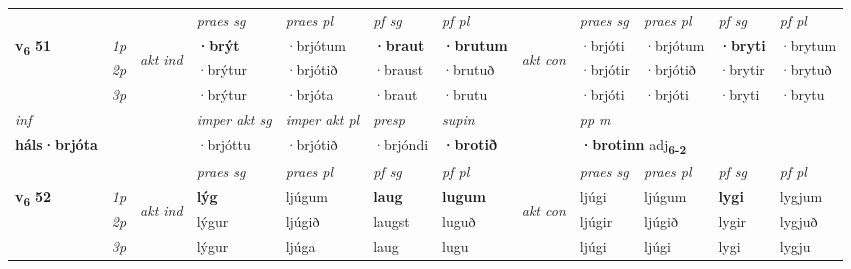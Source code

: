\begin{longtable}[l]{X>{\footnotesize\itshape}llXXXXlXXXX}
 & &   & \textit{praes sg}  & \textit{praes pl}    & \textit{ pf sg} & \textit{pf pl} & & \textit{praes sg}  & \textit{praes pl}    & \textit{pf sg} & \textit{pf pl }  \\ \cmidrule{4-7} \cmidrule{9-12}
 \multirow{2}{*}{{{\textbf{v{\textsubscript{6}}} \Large{\textbf{51}}}}}  & 1p & \multirow{3}{*}{\begin{turn}{90}\textit{akt ind}\end{turn}} & \textbf{·brýt} & ·brjótum & \textbf{·braut} & \textbf{·brutum} & \multirow{3}{*}{\begin{turn}{90}\textit{akt con}\end{turn}} &·brjóti & ·brjótum & \textbf{·bryti} & ·brytum\\*
 & 2p &  &  ·brýtur  & ·brjótið & ·braust & ·brutuð & & ·brjótir & ·brjótið & ·brytir & ·brytuð \\*
 & 3p &  & ·brýtur & ·brjóta & ·braut & ·brutu & & ·brjóti & ·brjóti& ·bryti & ·brytu \\*
\cmidrule{4-7} \cmidrule{9-12}

   {\textit{inf}} & &  & \textit{imper akt sg} & \textit{imper akt pl}   & \textit{presp} & \textit{supin}  && \textit{pp m} \\*
  {\textbf{háls\allowbreak ·brjóta}} & && ·brjóttu  & ·brjótið   & ·brjóndi &  \textbf{·brotið}  && \multicolumn{2}{l}{\textbf{·brotinn} adj\textbf{\textsubscript{6-2}}} \\*

\midrule

 & &   & \textit{praes sg}  & \textit{praes pl}    & \textit{ pf sg} & \textit{pf pl} & & \textit{praes sg}  & \textit{praes pl}    & \textit{pf sg} & \textit{pf pl }  \\ \cmidrule{4-7} \cmidrule{9-12}
 \multirow{2}{*}{{{\textbf{v{\textsubscript{6}}} \Large{\textbf{52}}}}}  & 1p & \multirow{3}{*}{\begin{turn}{90}\textit{akt ind}\end{turn}} & \textbf{lýg} & ljúgum & \textbf{laug} & \textbf{lugum} & \multirow{3}{*}{\begin{turn}{90}\textit{akt con}\end{turn}} &ljúgi & ljúgum & \textbf{lygi} & lygjum\\*
 & 2p &  &  lýgur  & ljúgið & laugst & luguð & & ljúgir & ljúgið & lygir & lygjuð \\*
 & 3p &  & lýgur & ljúga & laug & lugu & & ljúgi & ljúgi& lygi & lygju \\*
\cmidrule{4-7} \cmidrule{9-12}


\end{longtable}
